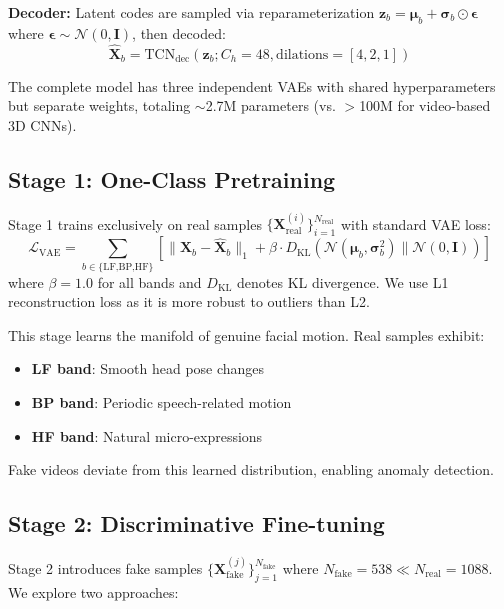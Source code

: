 \documentclass[11pt,twocolumn]{article}
\begin{document}
\textbf{Decoder:} Latent codes are sampled via reparameterization $\mathbf{z}_b = \boldsymbol{\mu}_b + \boldsymbol{\sigma}_b \odot \boldsymbol{\epsilon}$ where $\boldsymbol{\epsilon} \sim \mathcal{N}(0, \mathbf{I})$, then decoded:
\begin{equation}
    \hat{\mathbf{X}}_b = \text{TCN}_{\text{dec}}(\mathbf{z}_b; C_h=48, \text{dilations}=[4,2,1])
\end{equation}

The complete model has three independent VAEs with shared hyperparameters but separate weights, totaling $\sim$2.7M parameters (vs. $>$100M for video-based 3D CNNs).

\subsection{Stage 1: One-Class Pretraining}

Stage 1 trains exclusively on real samples $\{\mathbf{X}^{(i)}_{\text{real}}\}_{i=1}^{N_{\text{real}}}$ with standard VAE loss:
\begin{equation}
\mathcal{L}_{\text{VAE}} = \sum_{b \in \{\text{LF,BP,HF}\}} \left[ \|\mathbf{X}_b - \hat{\mathbf{X}}_b\|_1 + \beta \cdot D_{\text{KL}}(\mathcal{N}(\boldsymbol{\mu}_b, \boldsymbol{\sigma}^2_b) \| \mathcal{N}(0, \mathbf{I})) \right]
\end{equation}
where $\beta=1.0$ for all bands and $D_{\text{KL}}$ denotes KL divergence. We use L1 reconstruction loss as it is more robust to outliers than L2.

This stage learns the manifold of genuine facial motion. Real samples exhibit:
\begin{itemize}
    \item \textbf{LF band}: Smooth head pose changes
    \item \textbf{BP band}: Periodic speech-related motion
    \item \textbf{HF band}: Natural micro-expressions
\end{itemize}

Fake videos deviate from this learned distribution, enabling anomaly detection.

\subsection{Stage 2: Discriminative Fine-tuning}

Stage 2 introduces fake samples $\{\mathbf{X}^{(j)}_{\text{fake}}\}_{j=1}^{N_{\text{fake}}}$ where $N_{\text{fake}} = 538 \ll N_{\text{real}} = 1088$. We explore two approaches:
\end{document}

